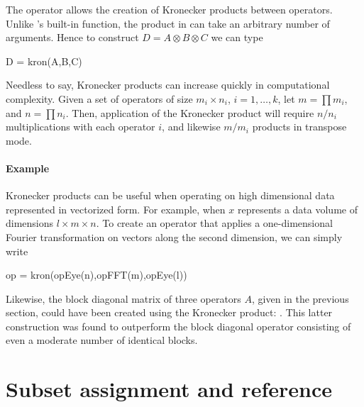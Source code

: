 The  operator allows the creation of Kronecker products
between operators. Unlike \matlab's built-in  function,
the  product in \sparco{} can take an arbitrary number of
arguments. Hence to construct $D = A \otimes B \otimes C$ we can type
\begin{codeblock}
D = kron(A,B,C)
\end{codeblock}
Needless to say, Kronecker products can increase quickly in
computational complexity. Given a set of operators of size $m_i\times
n_i$, $i=1,\ldots,k$, let $m = \prod m_i$, and $n = \prod n_i$. Then,
application of the Kronecker product will require $n / n_i$
multiplications with each operator $i$, and likewise $m / m_i$
products in transpose mode.

\paragraph{Example}
Kronecker products can be useful when operating on high dimensional
data represented in vectorized form. For example, when $x$ represents
a data volume of dimensions $l\times m\times n$.  To create an
operator that applies a one-dimensional Fourier transformation on
vectors along the second dimension, we can simply write
\begin{codeblock}
op = kron(opEye(n),opFFT(m),opEye(l))
\end{codeblock}
Likewise, the block diagonal matrix of three operators $A$, given in
the previous section, could have been created using the Kronecker
product: . This latter construction was
found to outperform the block diagonal operator consisting of even a
moderate number of identical blocks.

\vspace*{1em}

\section{Subset assignment and reference}

